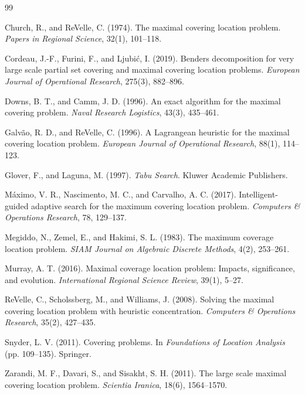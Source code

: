 \documentclass[11pt,a4paper]{article}
\begin{document}

\begin{thebibliography}{99}

Church, R., and ReVelle, C. (1974).
The maximal covering location problem.
\textit{Papers in Regional Science}, 32(1), 101--118.

Cordeau, J.-F., Furini, F., and Ljubić, I. (2019).
Benders decomposition for very large scale partial set covering and maximal covering location problems.
\textit{European Journal of Operational Research}, 275(3), 882--896.

Downs, B. T., and Camm, J. D. (1996).
An exact algorithm for the maximal covering problem.
\textit{Naval Research Logistics}, 43(3), 435--461.

Galvão, R. D., and ReVelle, C. (1996).
A Lagrangean heuristic for the maximal covering location problem.
\textit{European Journal of Operational Research}, 88(1), 114--123.

Glover, F., and Laguna, M. (1997).
\textit{Tabu Search}.
Kluwer Academic Publishers.

Máximo, V. R., Nascimento, M. C., and Carvalho, A. C. (2017).
Intelligent-guided adaptive search for the maximum covering location problem.
\textit{Computers \& Operations Research}, 78, 129--137.

Megiddo, N., Zemel, E., and Hakimi, S. L. (1983).
The maximum coverage location problem.
\textit{SIAM Journal on Algebraic Discrete Methods}, 4(2), 253--261.

Murray, A. T. (2016).
Maximal coverage location problem: Impacts, significance, and evolution.
\textit{International Regional Science Review}, 39(1), 5--27.

ReVelle, C., Scholssberg, M., and Williams, J. (2008).
Solving the maximal covering location problem with heuristic concentration.
\textit{Computers \& Operations Research}, 35(2), 427--435.

Snyder, L. V. (2011).
Covering problems.
In \textit{Foundations of Location Analysis} (pp. 109--135). Springer.

Zarandi, M. F., Davari, S., and Sisakht, S. H. (2011).
The large scale maximal covering location problem.
\textit{Scientia Iranica}, 18(6), 1564--1570.

\end{thebibliography}
\end{document}
